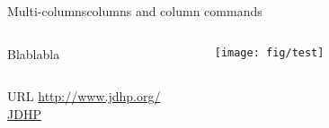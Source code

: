 \begin{frame}{Multi-columns}{columns and column commands}
    \begin{columns}
        \begin{column}{0.5\textwidth}

            Blablabla

        \end{column}
        \begin{column}{0.5\textwidth}

            \begin{center}
                \texttt{[image: fig/test]}
            \end{center}

        \end{column}
    \end{columns}
\end{frame}
\note{
}


\begin{frame}{URL}
    \url{http://www.jdhp.org/}  \\
    \href{http://www.jdhp.org/}{JDHP}
\end{frame}
\note{
}
